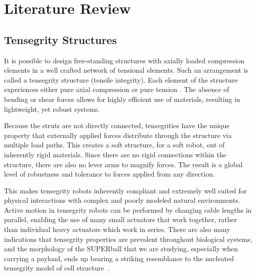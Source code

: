 \chapter{Literature Review}
\label{chapter:litReview}

\section{Tensegrity Structures}
It is possible to design free-standing structures with axially loaded compression elements in a well crafted network of tensional elements.
Such an arrangement is called a tensegrity structure (tensile integrity). 
Each element of the structure experiences either pure axial compression or pure tension \cite{BuckminsterFuller1975}\cite{Snelson1965}.
The absence of bending or shear forces allows for highly efficient use of materials, 
resulting in lightweight, yet robust systems.

Because the struts are not directly connected, 
tensegrities have the unique property that externally applied forces distribute through the structure via multiple load paths. 
This creates a soft structure, for a soft robot, out of inherently rigid materials.
Since there are no rigid connections within the structure, there are also no lever arms to magnify forces. 
The result is a global level of robustness and tolerance to forces applied from any direction.

This makes tensegrity robots inherently compliant and extremely well suited for physical interactions with complex and poorly modeled natural environments.  
Active motion in tensegrity robots can be performed by changing cable lengths in parallel, 
enabling the use of many small actuators that work together, rather than individual heavy actuators which work in series.  
There are also many indications that tensegrity properties are prevalent throughout biological systems, 
and the morphology of the SUPERball that we are studying, 
especially when carrying a payload, 
ends up bearing a striking resemblance to the nucleated tensegrity model of cell structure~\cite{Wang2009}\cite{Wang2001}.

